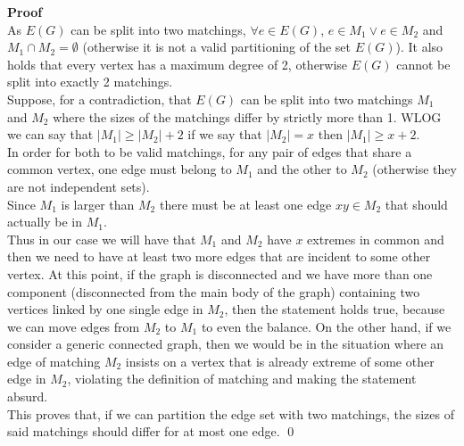 \begin{enumerate}[a)]
\unboldmath
\linebreak 
\textbf{Proof}\\
As $E(G)$ can be split into two matchings, $\forall e \in E(G)$, $e \in M_1 \lor e \in M_2$ and $M_1 \cap M_2 = \emptyset$ (otherwise it is not a valid partitioning of the set $E(G)$). It also holds that every vertex has a maximum degree of 2, otherwise $E(G)$ cannot be split into exactly 2 matchings.\\
\linebreak
Suppose, for a contradiction, that $E(G)$ can be split into two matchings $M_1$ and $M_2$ where the sizes of the matchings differ by strictly more than 1. WLOG we can say that $|M_1| \geq |M_2| + 2$ if we say that $|M_2| = x$ then  $|M_1| \geq x + 2$. \\
\linebreak 
In order for both to be valid matchings, for any pair of edges that share a common vertex, one edge must belong to $M_1$ and the other to $M_2$ (otherwise they are not independent sets). \\
\linebreak 
Since $M_1$ is larger than $M_2$ there must be at least one edge $xy \in M_2$ that should actually be in $M_1$.\\
\linebreak
Thus in our case we will have that $M_1$ and $M_2$ have $x$ extremes in common and then we need to have at least two more edges that are incident to some other vertex. At this point, if the graph is disconnected and we have more than one component (disconnected from the main body of the graph) containing two vertices linked by one single edge in $M_2$, then the statement holds true, because we can move edges from $M_2$ to $M_1$ to even the balance. On the other hand, if we consider a generic connected graph, then we would be in the situation where an edge of matching $M_2$ insists on a vertex that is already extreme of some other edge in $M_2$, violating the definition of matching and making the statement absurd.\\
This proves that, if we can partition the edge set with two matchings, the sizes of said matchings should differ for at most one edge. \qed
\end{enumerate}